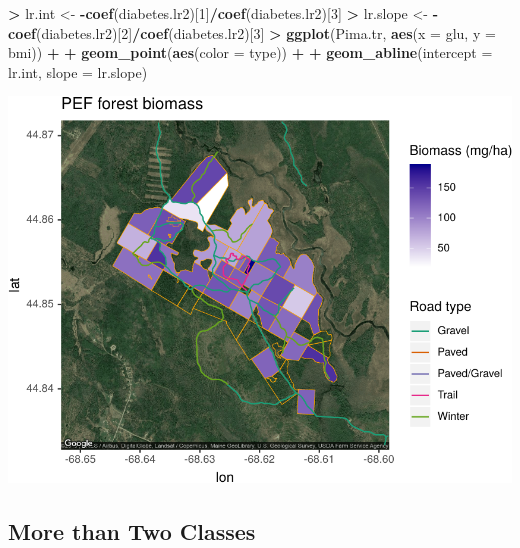 \documentclass[]{krantz}
\makeatletter
\newenvironment{Shaded}{\begin{snugshade}}{\end{snugshade}}
\newcommand{\DataTypeTok}[1]{\textcolor[rgb]{0.27,0.27,0.27}{#1}}
\newcommand{\DecValTok}[1]{\textcolor[rgb]{0.06,0.06,0.06}{#1}}
\newcommand{\KeywordTok}[1]{\textcolor[rgb]{0.27,0.27,0.27}{\textbf{#1}}}
\newcommand{\NormalTok}[1]{#1}
\newcommand{\OperatorTok}[1]{\textcolor[rgb]{0.43,0.43,0.43}{\textbf{#1}}}
\newcommand{\StringTok}[1]{\textcolor[rgb]{0.5,0.5,0.5}{#1}}
\newenvironment{kframe}{%
\medskip{}
\setlength{\fboxsep}{.8em}
 \def\at@end@of@kframe{}%
 \ifinner\ifhmode%
  \def\at@end@of@kframe{\end{minipage}}%
  \begin{minipage}{\columnwidth}%
 \fi\fi%
 \def\FrameCommand##1{\hskip\@totalleftmargin \hskip-\fboxsep
 \colorbox{shadecolor}{##1}\hskip-\fboxsep
     \hskip-\linewidth \hskip-\@totalleftmargin \hskip\columnwidth}%
 \MakeFramed {\advance\hsize-\width
   \@totalleftmargin\z@ \linewidth\hsize
   \@setminipage}}%
 {\par\unskip\endMakeFramed%
 \at@end@of@kframe}
\renewenvironment{Shaded}{\begin{kframe}}{\end{kframe}}
\makeatother
\begin{document}
\begin{Shaded}
\begin{Highlighting}[]
\OperatorTok{>}\StringTok{ }\NormalTok{lr.int <-}\StringTok{ }\OperatorTok{-}\KeywordTok{coef}\NormalTok{(diabetes.lr2)[}\DecValTok{1}\NormalTok{]}\OperatorTok{/}\KeywordTok{coef}\NormalTok{(diabetes.lr2)[}\DecValTok{3}\NormalTok{]}
\OperatorTok{>}\StringTok{ }\NormalTok{lr.slope <-}\StringTok{ }\OperatorTok{-}\KeywordTok{coef}\NormalTok{(diabetes.lr2)[}\DecValTok{2}\NormalTok{]}\OperatorTok{/}\KeywordTok{coef}\NormalTok{(diabetes.lr2)[}\DecValTok{3}\NormalTok{]}
\OperatorTok{>}\StringTok{ }\KeywordTok{ggplot}\NormalTok{(Pima.tr, }\KeywordTok{aes}\NormalTok{(}\DataTypeTok{x =}\NormalTok{ glu, }\DataTypeTok{y =}\NormalTok{ bmi)) }\OperatorTok{+}\StringTok{ }
\OperatorTok{+}\StringTok{   }\KeywordTok{geom_point}\NormalTok{(}\KeywordTok{aes}\NormalTok{(}\DataTypeTok{color =}\NormalTok{ type)) }\OperatorTok{+}\StringTok{ }
\OperatorTok{+}\StringTok{   }\KeywordTok{geom_abline}\NormalTok{(}\DataTypeTok{intercept =}\NormalTok{ lr.int, }\DataTypeTok{slope =}\NormalTok{ lr.slope)}
\end{Highlighting}
\end{Shaded}

\includegraphics{bookdown_files/figure-latex/unnamed-chunk-229-1.pdf}

\hypertarget{more-than-two-classes}{%
\subsection{More than Two Classes}\label{more-than-two-classes}}
\end{document}
